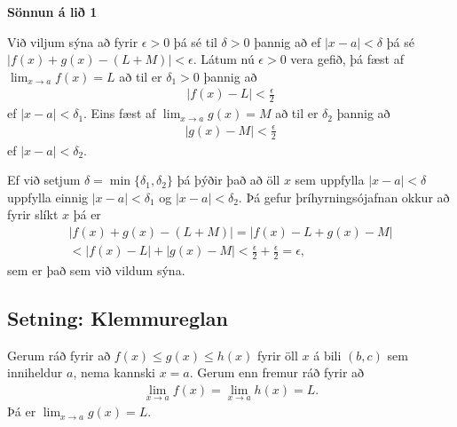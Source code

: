 \documentclass[a4paper,10pt,icelandic]{sphinxmanual}
\begin{document}
\textbf{Sönnun á lið 1}

Við viljum sýna að fyrir \(\epsilon>0\) þá sé til \(\delta>0\)
þannig að ef \(|x-a|<\delta\) þá sé \(|f(x)+g(x) - (L+M)|<\epsilon\).
Látum nú \(\epsilon>0\) vera gefið, þá fæst af
\(\lim_{x\to a} f(x) = L\) að til er \(\delta_1>0\) þannig að
\begin{equation*}
\begin{split}|f(x)-L| < \frac \epsilon 2\end{split}
\end{equation*}
ef \(|x-a|<\delta_1\). Eins fæst af \(\lim_{x \to a} g(x)=M\)
að til er \(\delta_2\) þannig að
\begin{equation*}
\begin{split}|g(x)-M| < \frac \epsilon 2\end{split}
\end{equation*}
ef \(|x-a|<\delta_2\).

Ef við setjum \(\delta = \min\{\delta_1,\delta_2\}\) þá þýðir það að
öll \(x\) sem uppfylla \(|x-a|<\delta\) uppfylla einnig
\(|x-a|<\delta_1\) og \(|x-a|<\delta_2\). Þá gefur þríhyrningsójafnan
okkur að fyrir slíkt \(x\) þá er
\begin{equation*}
\begin{split}|f(x)+g(x) - (L+M)| = |f(x)-L + g(x)-M| \\
< |f(x)-L| + |g(x)-M| < \frac \epsilon 2 + \frac \epsilon 2 = \epsilon,\end{split}
\end{equation*}
sem er það sem við vildum sýna.


\subsection{Setning: Klemmureglan}
\label{kafli02:setning-klemmureglan}\label{kafli02:index-3}
Gerum ráð fyrir að \(f(x)\leq
g(x)\leq h(x)\) fyrir öll \(x\) á bili \((b, c)\) sem inniheldur
\(a\), nema kannski \(x=a\). Gerum enn fremur ráð fyrir að
\begin{equation*}
\begin{split}\lim_{x\rightarrow a}f(x)=\lim_{x\rightarrow a}h(x)=L.\end{split}
\end{equation*}
Þá er \(\lim_{x\rightarrow a}g(x)=L\).

\end{document}

